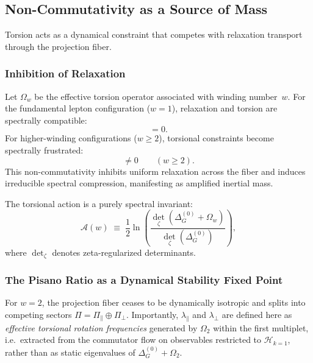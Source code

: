 \subsection{Non-Commutativity as a Source of Mass}
  \label{sec:noncommutativity-mass}

  Torsion acts as a dynamical constraint that competes with relaxation transport through the projection fiber.

  \subsubsection*{Inhibition of Relaxation}
    \label{sec:inhibition-relaxation}

    Let $\Omega_w$ be the effective torsion operator associated with winding number~$w$.
    For the fundamental lepton configuration ($w=1$), relaxation and torsion are spectrally compatible:
    \begin{equation}
      [\Delta^{(0)}_G,\Omega_{1}] = 0 .
    \end{equation}
    For higher-winding configurations ($w\ge 2$), torsional constraints become spectrally frustrated:
    \begin{equation}
      [\Delta^{(0)}_G,\Omega_{w}] \neq 0
      \qquad (w\ge 2).
    \end{equation}
    This non-commutativity inhibits uniform relaxation across the fiber and induces irreducible spectral compression, manifesting as
    amplified inertial mass.

    The torsional action is a purely spectral invariant:
    \begin{equation}
      \mathcal{A}(w) \;\equiv\;
      \frac12 \ln\!\left(
                     \frac{\det_\zeta(\Delta^{(0)}_G+\Omega_{w})}
                     {\det_\zeta(\Delta^{(0)}_G)}
      \right),
      \label{eq:Aw-fredholm}
    \end{equation}
    where $\det_\zeta$ denotes zeta-regularized determinants.

  \subsubsection*{The Pisano Ratio as a Dynamical Stability Fixed Point}
    \label{sec:pisano-ratio}

    For $w=2$, the projection fiber ceases to be dynamically isotropic and splits into competing sectors
    $\Pi=\Pi_{\parallel}\oplus\Pi_{\perp}$.
    Importantly, $\lambda_{\parallel}$ and $\lambda_{\perp}$ are defined here as \emph{effective torsional rotation frequencies}
    generated by $\Omega_2$ within the first multiplet, i.e.\ extracted from the commutator flow on observables restricted to
    $\mathcal{H}_{k=1}$, rather than as static eigenvalues of $\Delta^{(0)}_G+\Omega_2$.

